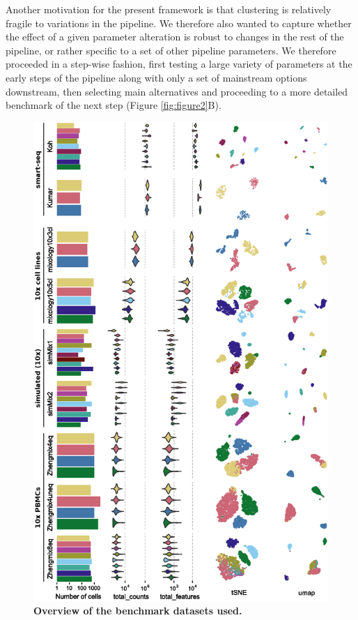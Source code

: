 \documentclass{bmcart}
\begin{document}
Another motivation for the present framework is that clustering is relatively fragile to variations in the pipeline. We therefore also wanted to capture whether the effect of a given parameter alteration is robust to changes in the rest of the pipeline, or rather specific to a set of other pipeline parameters. We therefore proceeded in a step-wise fashion, first testing a large variety of parameters at the early steps of the pipeline along with only a set of mainstream options downstream, then selecting main alternatives and proceeding to a more detailed benchmark of the next step (Figure \ref{fig:figure2}B).

\begin{figure}
    \centering
    \includegraphics[width=\textwidth,keepaspectratio]{dataset_description}
    \caption{\textbf{Overview of the benchmark datasets used.}}
    \label{fig:figure1}
\end{figure}
\end{document}
